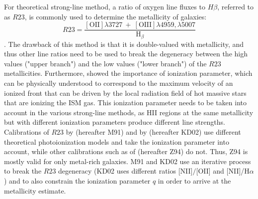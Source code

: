 \documentclass{emulateapj}
\newcommand{\ha}{H$\alpha$}
\begin{document}
For theoretical strong-line method, a ratio of oxygen line fluxes to $H\beta$, referred to as $R23$, is commonly used to determine the metallicity of galaxies:
$$R23=\frac{\mathrm{[OII]} \lambda 3727~+~\mathrm{[OIII]} \lambda 4959,\lambda 5007}{\mathrm{H}_\beta}$$
\citep{pagel79}. The drawback of this method is that it is double-valued with metallicity, and thus other line ratios need to be used to break the degeneracy between the high values ("upper branch") and the low values ("lower branch") of the $R23$ metallicities. 
Furthermore, \citet{kewley02} showed the importance of ionization parameter, which can be physically understood to correspond to the maximum velocity of an ionized front that can be driven by the local radiation field of hot massive stars that are ionizing the ISM gas. This ionization parameter needs to be taken into account in the various strong-line methods, as HII regions at the same metallicity but with different ionization parameters produce different line strengths. Calibrations of $R23$ by \citet{mcgaugh91} (hereafter M91) and by \citet{kewley02} (hereafter KD02) use different theoretical photoionization models and take the ionization parameter into account, while other calibrations such as of \citet{zaritsky94} (hereafter Z94) do not. Thus, Z94 is mostly valid for only metal-rich galaxies.  M91 and KD02 use an iterative process to break the $R23$ degeneracy  (KD02 uses different ratios [NII]$/$[OII] and [NII]/\ha) and to also constrain the ionization parameter $q$ in order to arrive at the metallicity estimate.
\end{document}
